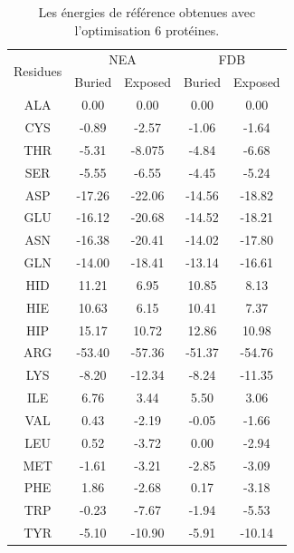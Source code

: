 \documentclass[a4paper,12pt]{article}
\begin{document}
    \begin{table}[!htbp]
      \centering

      \begin{tabular}{ccccc}

        \toprule
        \toprule
        \multirow{2}{*}{Residues}  & \multicolumn{2}{c}{NEA} & \multicolumn{2}{c}{FDB} \\
        \cmidrule(l{2pt}r{2pt}){2-3} \cmidrule(l{2pt}r{2pt}){4-5}
         & Buried & Exposed & Buried & Exposed \\
        \cmidrule{1-5}

        ALA &   0.00     &  0.00    &   0.00  &   0.00       \\
        CYS &  -0.89     &  -2.57   &  -1.06  &   -1.64      \\
        THR &  -5.31     &  -8.075  &  -4.84  &   -6.68      \\
        SER &  -5.55     &  -6.55   &  -4.45  &   -5.24      \\
        ASP &  -17.26    &  -22.06  &  -14.56 &   -18.82     \\
        GLU &  -16.12    &  -20.68  &  -14.52 &   -18.21     \\
        ASN &  -16.38    &  -20.41  &  -14.02 &   -17.80     \\
        GLN &  -14.00    &  -18.41  &  -13.14 &   -16.61     \\
        HID &   11.21    &  6.95    &  10.85  &   8.13       \\
        HIE &   10.63    &  6.15    &  10.41  &   7.37       \\
        HIP &   15.17    &  10.72   &  12.86  &   10.98      \\
        ARG &  -53.40    &  -57.36  &  -51.37 &   -54.76     \\
        LYS &  -8.20     &  -12.34  &  -8.24  &   -11.35     \\
        ILE &   6.76     &  3.44    &  5.50   &   3.06       \\
        VAL &   0.43     &  -2.19   &  -0.05  &   -1.66      \\
        LEU &   0.52     &  -3.72   &  0.00   &   -2.94      \\
        MET &  -1.61     &  -3.21   &  -2.85  &   -3.09      \\
        PHE &   1.86     &  -2.68   &  0.17   &   -3.18      \\
        TRP &  -0.23     &  -7.67   &  -1.94  &   -5.53      \\
        TYR &  -5.10     &  -10.90  &  -5.91  &   -10.14     \\

        \bottomrule


      \end{tabular}      
      \caption{Les énergies de référence obtenues avec l'optimisation 6 protéines.}
\label{tab:RefEner_groupes}      
    \end{table}



   
\thispagestyle{empty}
\end{document}
